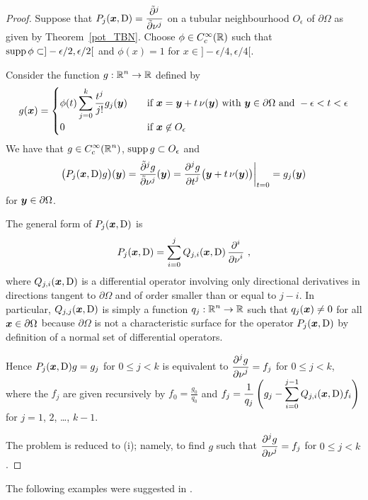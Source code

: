 \begin{proof}
 Suppose that
$\displaystyle P_j({\bm{x}},\operatorname{D}) = \frac{\tilde{\partial}^{j}{}}{\tilde{\partial}{\nu}^{j}}$ on a
tubular neighbourhood $O_\epsilon$ of $\partial \Omega$ as given
by Theorem~\ref{pot_TBN}.  Choose $\phi\in C^\infty_c(\mathbb{R})$ such that
$\displaystyle \operatorname{supp} \phi \subset ]-\epsilon/2, \epsilon/2[$ and
$\phi(x) = 1$ for $x\in]-\epsilon/4, \epsilon/4[$.

Consider the function $\displaystyle g:\mathbb{R}^n \rightarrow \mathbb{R}$ defined by
\[
g({\bm{x}}) =
\begin{cases}
\displaystyle \phi(t) \sum_{j=0}^k \frac{t^j}{j!} g_j({\bm{y}}) &\quad
\text{if} \ {\bm{x}} = {\bm{y}} + t\, \nu({\bm{y}}) \
\text{with} \ {\bm{y}} \in \partial \Omega \ \text{and} \
-\epsilon < t < \epsilon \\[0.7em]
0 & \quad \text{if} \ {\bm{x}} \not\in O_\epsilon
\end{cases}
\]
We have that $\displaystyle g\in C^\infty_c(\mathbb{R}^n)$,
$\displaystyle \operatorname{supp} g \subset O_\epsilon$ and
\[
\big( P_j({\bm{x}},\operatorname{D})g\big)({\bm{y}}) = \frac{\tilde{\partial}^{j}{g}}{\tilde{\partial}{\nu}^{j}}({\bm{y}})
= \frac{\displaystyle \partial^{j}{g}} {\displaystyle \partial t^{j}}\big({\bm{y}}+t\, \nu({\bm{y}})\big)\bigg|_{t=0}
= g_j({\bm{y}})
\]
for ${\bm{y}} \in \partial \Omega$.

 The general form of $P_j({\bm{x}},\operatorname{D})$ is
\[
P_j({\bm{x}},\operatorname{D}) = \sum_{i=0}^j Q_{j,i}({\bm{x}},\operatorname{D})\,
\frac{\displaystyle \partial^{i}{}} {\displaystyle \partial \nu^{i}} \  ,
\]
where $Q_{j,i}({\bm{x}},\operatorname{D})$ is a differential operator involving only
directional derivatives in directions tangent to $\partial \Omega$ and
of order smaller than or equal to $j-i$.  In particular,
$Q_{j,j}({\bm{x}},\operatorname{D})$ is simply a function
$\displaystyle q_j:\mathbb{R}^n\rightarrow \mathbb{R}$
such that $q_j({\bm{x}}) \neq 0$ for all ${\bm{x}} \in \partial \Omega$
because $\partial \Omega$ is not a characteristic surface for the
operator $P_j({\bm{x}},\operatorname{D})$ by definition of a normal set of differential
operators.

Hence $P_j({\bm{x}},\operatorname{D})g=g_j$ for $0\leq j < k$ is equivalent to
$\displaystyle \frac{\displaystyle \partial^{j}{g}} {\displaystyle \partial \nu^{j}} = f_j$ for $0\leq j < k$, where
the $f_j$ are given recursively by $\displaystyle f_0 = \frac{g_0}{q_0}$
and
$\displaystyle f_j = \frac{1}{q_j} \left( g_j - \sum_{i=0}^{j-1}
Q_{j,i}({\bm{x}},\operatorname{D}) f_i \right)$
for $j=1$, $2$, \ldots, $k-1$.

The problem is reduced to (i); namely, to find $g$ such
that $\displaystyle \frac{\displaystyle \partial^{j}{g}} {\displaystyle \partial \nu^{j}} = f_j$ for $0\leq j < k$.
\end{proof}

The following examples were suggested in \cite{FoPDE}.

